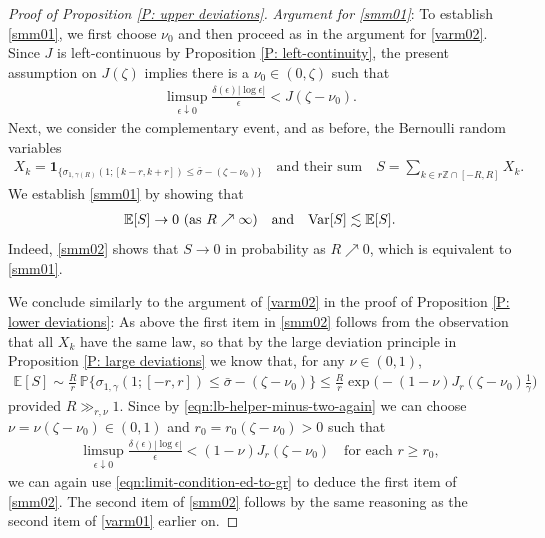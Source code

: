\documentclass[12pt]{amsart}
\begin{document}
\begin{proof}[Proof of Proposition \ref{P: upper deviations}]
			\textit{Argument for \eqref{smm01}}: To establish \eqref{smm01}, we first choose $\nu_{0}$ and then proceed as in the argument for \eqref{varm02}.  Since $J$ is left-continuous by Proposition \ref{P: left-continuity}, the present assumption on $J(\zeta)$ implies there is a $\nu_{0} \in (0, \zeta)$ such that 
				\begin{align} \label{eqn:lb-helper-minus-two-again}
					\limsup_{ \epsilon \downarrow 0 } \frac{ \delta(\epsilon) |\log \epsilon| }{ \epsilon } < J ( \zeta - \nu_{0} ).
				\end{align}
			Next, we consider the complementary event, and as before, the Bernoulli random variables
			\begin{align*}
				X_{ k } = \boldsymbol{1}_{ \{  \sigma_{ 1 , \gamma(R) } ( 1; [ k - r , k + r ] ) \leq \bar{\sigma} - ( \zeta - \nu_{0} ) \} } 
				\quad \text{and their sum} \quad
				S = \sum_{ k \in r \mathbb{Z} \cap [ - R , R  ] } X_k .
			\end{align*}
			We establish \eqref{smm01} by showing that
			\begin{align}\label{smm02}
				 \mathbb{E} [ S ] \rightarrow 0 ~ ( \text{as} ~ R \nearrow \infty )
				 \quad \text{and} \quad
				 { \rm Var } [ S ] \lesssim \mathbb{E} [ S ] .
			\end{align}
			Indeed, \eqref{smm02} shows that $ S \rightarrow 0 $ in probability as $ R \nearrow 0 $, which is equivalent to \eqref{smm01}.
			
			We conclude similarly to the argument of \eqref{varm02} in the proof of Proposition \ref{P: lower deviations}: As above the first item in \eqref{smm02} follows from the observation that all $ X_k $ have the same law, so that by the large deviation principle in Proposition \ref{P: large deviations} we know that, for any $\nu \in (0,1)$,
			\begin{align*}
				\mathbb{E} [ S ] 
				\sim \frac{ R }{ r } \, \mathbb{P} \big\{  \sigma_{ 1 , \gamma } ( 1;  [ - r , r ] ) \leq \bar{\sigma} - ( \zeta - \nu_{0} ) \big\} 
				\leq  \frac{ R }{ r } \exp \Big( - ( 1 - \nu ) J_{ r } ( \zeta - \nu_{0} ) \frac{ 1 }{ \gamma } \Big) 
			\end{align*}
			provided $R \gg_{r,\nu} 1$.  Since by \eqref{eqn:lb-helper-minus-two-again} we can choose $\nu = \nu(\zeta - \nu_{0}) \in (0,1)$ and $r_{0} = r_{0}(\zeta-\nu_{0}) > 0$ such that 
				\begin{align*}
					\limsup_{ \epsilon \downarrow 0 } \frac{ \delta(\epsilon) |\log \epsilon| }{ \epsilon } < ( 1 - \nu ) J_{r} ( \zeta - \nu_{0} ) \quad \text{for each} \, \, r \geq r_{0},
				\end{align*}
			we can again use \eqref{eqn:limit-condition-ed-to-gr} to deduce the first item of \eqref{smm02}. The second item of \eqref{smm02} follows by the same reasoning as the second item of \eqref{varm01} earlier on.
		\end{proof}
\end{document}
